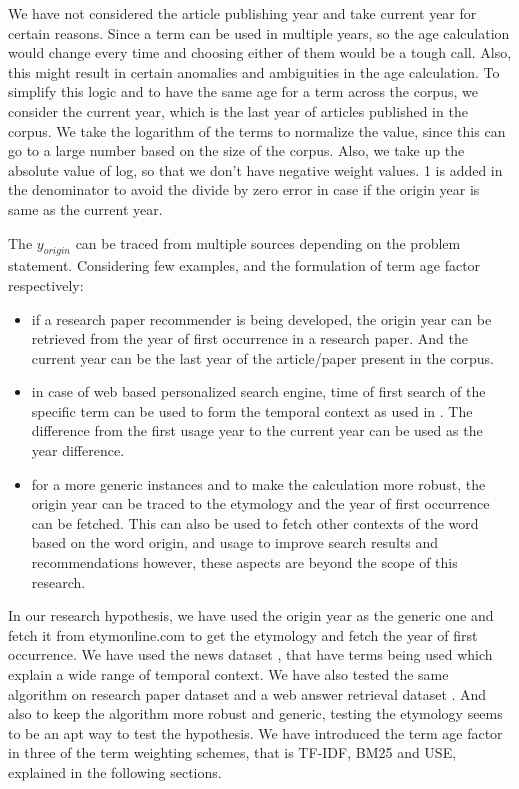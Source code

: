 We have not considered the article publishing year and take current year for certain reasons. Since a term can be used in multiple years, so the age calculation would change every time and choosing either of them would be a tough call. Also, this might result in certain anomalies and ambiguities in the age calculation. To simplify this logic and to have the same age for a term across the corpus, we consider the current year, which is the last year of articles published in the corpus. We take the logarithm of the terms to normalize the value, since this can go to a large number based on the size of the corpus. Also, we take up the absolute value of log, so that we don’t have negative weight values. 1 is added in the denominator to avoid the divide by zero error in case if the origin year is same as the current year. 

The $y_{origin}$ can be traced from multiple sources depending on the problem statement. Considering few examples, and the formulation of term age factor respectively:
\begin{itemize}
    \item if a research paper recommender is being developed, the origin year can be retrieved from the year of first occurrence in a research paper. And the current year can be the last year of the article/paper present in the corpus.
    \item in case of web based personalized search engine, time of first search of the specific term can be used to form the temporal context as used in \cite{RN27}. The difference from the first usage year to the current year can be used as the year difference.
    \item for a more generic instances and to make the calculation more robust, the origin year can be traced to the etymology and the year of first occurrence can be fetched. This can also be used to fetch other contexts of the word based on the word origin, and usage to improve search results and recommendations however, these aspects are beyond the scope of this research.
\end{itemize}
In our research hypothesis, we have used the origin year as the generic one and fetch it from etymonline.com to get the etymology and fetch the year of first occurrence. We have used the news dataset \cite{RN20}, that have terms being used which explain a wide range of temporal context. We have also tested the same algorithm on research paper dataset \cite{DBLP:conf/ijcai/WangCL13} and a web answer retrieval dataset \cite{RN30, RN31}. And also to keep the algorithm more robust and generic, testing the etymology seems to be an apt way to test the hypothesis. We have introduced the term age factor in three of the term weighting schemes, that is TF-IDF, BM25 and USE, explained in the following sections.


